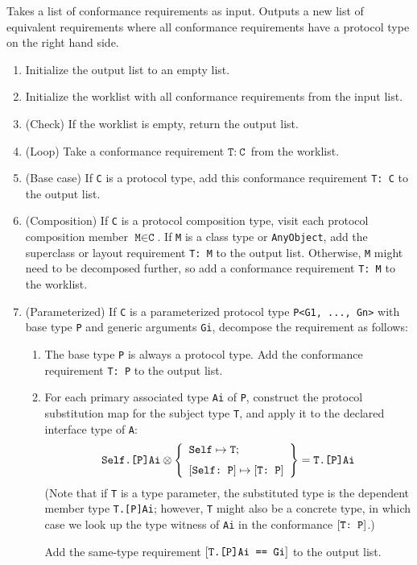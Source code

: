\documentclass[../generics]{subfiles}
\begin{document}
\begin{algorithm}\label{expand conformance req algorithm} Takes a list of conformance requirements as input. Outputs a new list of equivalent requirements where all conformance requirements have a protocol type on the right hand side.
\begin{enumerate}
\item Initialize the output list to an empty list.
\item Initialize the worklist with all conformance requirements from the input list.
\item (Check) If the worklist is empty, return the output list.
\item (Loop) Take a conformance requirement $\texttt{T}:~\texttt{C}$ from the worklist.
\item (Base case) If \texttt{C} is a protocol type, add this conformance requirement \texttt{T:~C} to the output list.
\item (Composition) If \texttt{C} is a protocol composition type, visit each protocol composition member $\texttt{M}\in\texttt{C}$. If \texttt{M} is a class type or \texttt{AnyObject}, add the superclass or layout requirement \texttt{T:~M} to the output list. Otherwise, \texttt{M} might need to be decomposed further, so add a conformance requirement \texttt{T:~M} to the worklist.
\item (Parameterized) If \texttt{C} is a parameterized protocol type \texttt{P<G1, ..., Gn>} with base type \texttt{P} and generic arguments \texttt{Gi}, decompose the requirement as follows:
\begin{enumerate}
\item The base type \texttt{P} is always a protocol type. Add the conformance requirement \texttt{T:~P} to the output list.
\item For each primary associated type \texttt{Ai} of \texttt{P}, construct the protocol substitution map for the subject type \texttt{T}, and apply it to the declared interface type of \texttt{A}:
\[\texttt{Self.[P]Ai} \otimes \SubstMapLongC{\SubstType{Self}{T}}{\SubstConf{Self}{T}{P}} = \texttt{T.[P]Ai}\]
(Note that if \texttt{T} is a type parameter, the substituted type is the dependent member type \texttt{T.[P]Ai}; however, \texttt{T} might also be a concrete type, in which case we look up the type witness of \texttt{Ai} in the conformance $[\texttt{T:~P}]$.)

Add the same-type requirement $[\texttt{T.[P]Ai == Gi}]$ to the output list.
\end{enumerate}
\end{enumerate}
\end{algorithm}
\end{document}
